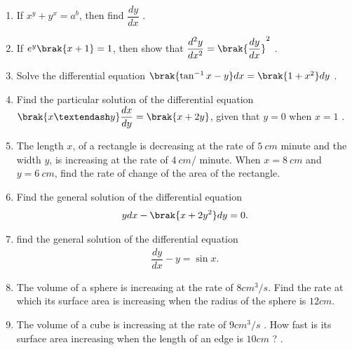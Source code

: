\begin{enumerate}
\item If $x^y+y^x=a^b$, then find $\dfrac{dy}{dx}$ .
\item If $e^y\brak{x+1}=1$, then show that $\dfrac{d^2y}{dx^2}=\brak{\dfrac{dy}{dx}}^2$ .
\item Solve the differential equation $\brak{\tan^{-1}x-y}dx =\brak{1+x^2}dy$ .
\item Find the particular solution of the differential equation $\brak{x – y}\dfrac {dx}{dy} = \brak{x + 2y}$, given that $y = 0$ when $x = 1$ .
\item The length $x$, of a rectangle is decreasing at the rate of $5~cm$ minute and the width $y$, is increasing at the rate of $4~cm /$ minute. When $x=8~cm$ and $y=6~cm$, find the rate of change of the area of the rectangle.
\item Find the general solution of the differential equation
\begin{align*}
  ydx-\brak{x+2 y^2}dy=0.  
\end{align*}
\item find the general solution of the differential equation
\begin{align*}\dfrac{dy}{dx}-y=\sin x.\end{align*}
\item The volume of a sphere is increasing at the rate of $8{cm}^{3}/s$. Find the rate at which its surface area is increasing when the radius of the sphere is $12 {cm}$.
\item The volume of a cube is increasing at the rate of  $9{cm}^{3}/s$ . How fast is its surface area increasing when the length of an edge is $10cm$ ? .
\end{enumerate}
